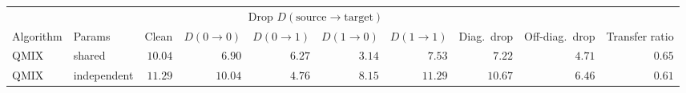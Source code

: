 \begin{tabular}{llrrrrrrrr}
\toprule
& & & \multicolumn{4}{c}{Drop $D(\text{source}\to\text{target})$} & & & \\
\cmidrule(lr){4-7}
Algorithm & Params & Clean & $D(0\!\to\!0)$ & $D(0\!\to\!1)$ & $D(1\!\to\!0)$ & $D(1\!\to\!1)$ & Diag.\ drop & Off-diag.\ drop & Transfer ratio \\
\midrule
QMIX & shared      & $10.04$ & $6.90$  & $6.27$ & $3.14$ & $7.53$  & $7.22$  & $4.71$ & $0.65$ \\
QMIX & independent & $11.29$ & $10.04$ & $4.76$ & $8.15$ & $11.29$ & $10.67$ & $6.46$ & $0.61$ \\
\bottomrule
\end{tabular}
